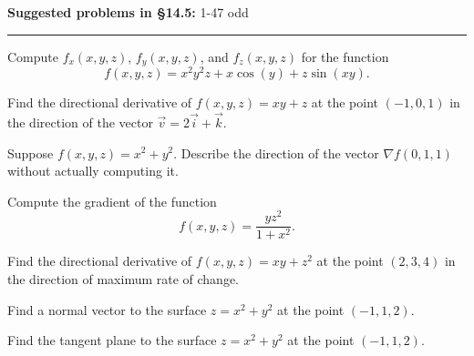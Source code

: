 \documentclass[12pt,reqno]{amsart}
\begin{document}
\textbf{Suggested problems in \S14.5:} 1-47 odd

\medskip
\hrule

\bigskip

\prob Compute $f_x(x,y,z)$, $f_y(x,y,z)$, and $f_z(x,y,z)$ for the function
	\[f(x,y,z) = x^2y^2z + x\cos{(y)} + z \sin{(xy)}.
	\]

\vfill
\prob Find the directional derivative of $f (x, y, z) = xy + z$ at the point $(-1, 0, 1)$ in the direction of the vector $\vec{v} = 2 \vec{i} + \vec{k}$.

\vfill
\prob Suppose $f(x,y,z) = x^2+y^2$. Describe the direction of the vector $\nabla f(0,1,1)$ without actually computing it.

\vfill
\prob Compute the gradient of the function
	\[f(x,y,z) = \frac{yz^2}{1+x^2}.
	\]

\vfill
\newpage
\prob Find the directional derivative of $f(x,y,z) = xy+z^2$ at the point $(2,3,4)$ in the direction of maximum rate of change.

\vfill
\prob Find a normal vector to the surface $z=x^2+y^2$ at the point $(-1,1,2)$.

\vfill
\prob Find the tangent plane to the surface $z=x^2+y^2$ at the point $(-1,1,2)$.
\vfill
\end{document}

